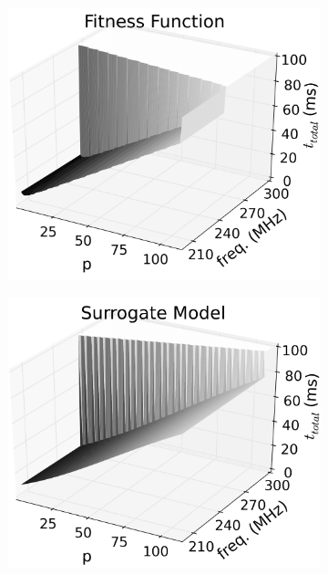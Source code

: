 \documentclass[runningheads,a4paper]{llncs}
\begin{document}
\begin{figure}
        \centering
        \begin{subfigure}{0.31\textwidth}
                \centering
                \includegraphics[width=\textwidth]{./figs/fitness1.png}
        \end{subfigure}
        \begin{subfigure}{0.31\textwidth}
                \centering
                \includegraphics[width=\textwidth]{./figs/surmodel009_11.png}

\end{subfigure}
\end{figure}
\end{document}
